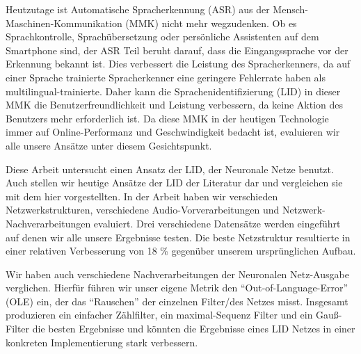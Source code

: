 
\Abstract

Heutzutage ist Automatische Spracherkennung (ASR) aus der Mensch-Maschinen-\newline Kommunikation (MMK) nicht mehr wegzudenken. Ob es Sprachkontrolle, Sprachübersetzung oder persönliche Assistenten auf dem Smartphone sind, der ASR Teil beruht darauf,  dass die Eingangssprache vor der Erkennung bekannt ist. Dies verbessert die Leistung des Spracherkenners, da auf einer Sprache trainierte Spracherkenner eine geringere Fehlerrate haben als multilingual-trainierte. Daher kann die Sprachenidentifizierung (LID) in dieser MMK die Benutzerfreundlichkeit und Leistung verbessern, da keine Aktion des Benutzers mehr erforderlich ist. Da diese MMK in der heutigen Technologie immer auf Online-Performanz und Geschwindigkeit bedacht ist, evaluieren wir alle unsere Ansätze unter diesem Gesichtspunkt.

Diese Arbeit untersucht einen Ansatz der LID, der Neuronale Netze benutzt. Auch stellen wir heutige Ansätze der LID der Literatur dar und vergleichen sie mit dem hier vorgestellten. In der Arbeit haben wir verschieden Netzwerkstrukturen, verschiedene Audio-Vorverarbeitungen und Netzwerk-Nachverarbeitungen evaluiert. Drei verschiedene Datensätze werden eingeführt auf denen wir alle unsere Ergebnisse testen. Die beste Netzstruktur resultierte in einer relativen Verbesserung von 18 \% gegenüber unserem ursprünglichen Aufbau.

Wir haben auch verschiedene Nachverarbeitungen der Neuronalen Netz-Ausgabe verglichen. Hierfür führen wir unser eigene Metrik den ``Out-of-Language-Error'' (OLE) ein, der das ``Rauschen'' der einzelnen Filter/des Netzes misst. Insgesamt produzieren ein einfacher Zählfilter, ein maximal-Sequenz Filter und ein Gauß-Filter die besten Ergebnisse und könnten die Ergebnisse eines LID Netzes in einer konkreten Implementierung stark verbessern.